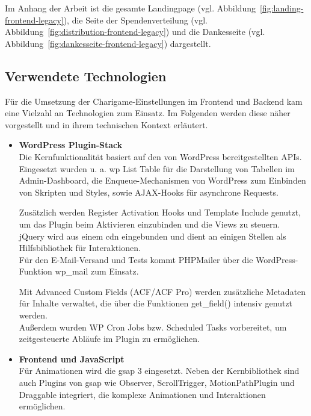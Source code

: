 Im Anhang der Arbeit ist die gesamte Landingpage (vgl. Abbildung~\ref{fig:landing-frontend-legacy}), die Seite der Spendenverteilung (vgl. Abbildung~\ref{fig:distribution-frontend-legacy}) und die Dankesseite (vgl. Abbildung~\ref{fig:dankesseite-frontend-legacy}) dargestellt.

\subsection{Verwendete Technologien}
Für die Umsetzung der Charigame-Einstellungen im Frontend und Backend kam eine Vielzahl an Technologien zum Einsatz.
Im Folgenden werden diese näher vorgestellt und in ihrem technischen Kontext erläutert.

\begin{itemize}
    \item \textbf{WordPress Plugin-Stack}\\
    Die Kernfunktionalität basiert auf den von WordPress bereitgestellten APIs. %
    Eingesetzt wurden u. a. \gls{wp} List Table für die Darstellung von Tabellen im Admin-Dashboard, die Enqueue-Mechanismen von WordPress zum Einbinden von Skripten und Styles, sowie AJAX-Hooks für asynchrone Requests.

    Zusätzlich werden Register Activation Hooks und Template Include genutzt, um das Plugin beim Aktivieren einzubinden und die Views zu steuern.\\
    jQuery wird aus einem \gls{cdn} eingebunden und dient an einigen Stellen als Hilfsbibliothek für Interaktionen.\\
    Für den E-Mail-Versand und Tests kommt PHPMailer über die WordPress-Funktion wp\_mail zum Einsatz.

    Mit Advanced Custom Fields (ACF/ACF Pro) werden zusätzliche Metadaten für Inhalte verwaltet, die über die Funktionen get\_field() intensiv genutzt werden.\\
    Außerdem wurden WP Cron Jobs bzw. Scheduled Tasks vorbereitet, um zeitgesteuerte Abläufe im Plugin zu ermöglichen.

    \item \textbf{Frontend und JavaScript}\\
    Für Animationen wird die \gls{gsap} 3 eingesetzt.
    Neben der Kernbibliothek sind auch Plugins von \gls{gsap} wie Observer, ScrollTrigger, MotionPathPlugin und Draggable integriert, die komplexe Animationen und Interaktionen ermöglichen.


\end{itemize}
